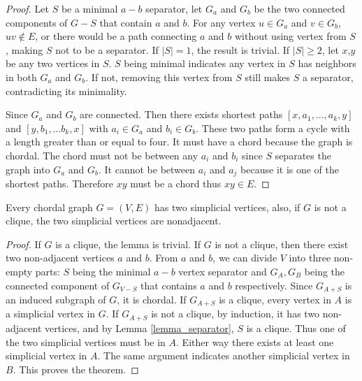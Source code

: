 \begin{proof}
Let $S$ be a minimal $a-b$ separator, let $G_a$ and $G_b$ be the two connected components of $G-S$ that contain $a$ and $b$. For any vertex $u \in G_a$ and $v \in G_b$, $uv \notin E$, or there would be a path connecting $a$ and $b$ without using vertex from $S$, making $S$ not to be a separator. If $|S| = 1$, the result is trivial. If $|S| \ge 2$, let $x$,$y$ be any two vertices in $S$. $S$ being minimal indicates any vertex in $S$ has neighbors in both $G_a$ and $G_b$. If not, removing this vertex from $S$ still makes $S$ a separator, contradicting its minimality.

Since $G_a$ and $G_b$ are connected. Then there exists shortest paths $[x, a_1,...,a_k ,y]$ and $[y, b_1, ... b_k,x]$ with $a_i \in G_a$ and $b_i \in G_b$. These two paths form a cycle with a length greater than or equal to four. It must have a chord because the graph is chordal. The chord must not be between any $a_i$ and $b_i$ since $S$ separates the graph into $G_a$ and $G_b$. It cannot be between $a_i$ and $a_j$ because it is one of the shortest paths. Therefore $xy$ must be a chord thus $xy \in E$.  
\end{proof}

\begin{theorem}
\label{lemma_simplicial}
Every chordal graph $G = (V, E)$ has two simplicial vertices, also, if $G$ is not a clique, the two simplicial vertices are nonadjacent.
\end{theorem}

\begin{proof}
If $G$ is a clique, the lemma is trivial. If $G$ is not a clique, then there exist two non-adjacent vertices $a$ and $b$. From $a$ and $b$, we can divide $V$ into three non-empty parts: $S$ being the minimal $a-b$ vertex separator and $G_A, G_B$ being the connected component of $G_{V-S}$ that contains $a$ and $b$ respectively. Since $G_{A+S}$ is an induced subgraph of $G$, it is chordal. If $G_{A+S}$ is a clique, every vertex in $A$ is a simplicial vertex in $G$. If $G_{A+S}$ is not a clique, by induction, it has two non-adjacent vertices, and by Lemma \ref{lemma_separator}, $S$ is a clique. Thus one of the two simplicial vertices must be in $A$.
Either way there exists at least one simplicial vertex in $A$. The same argument indicates another simplicial vertex in $B$. This proves the theorem.
\end{proof}






